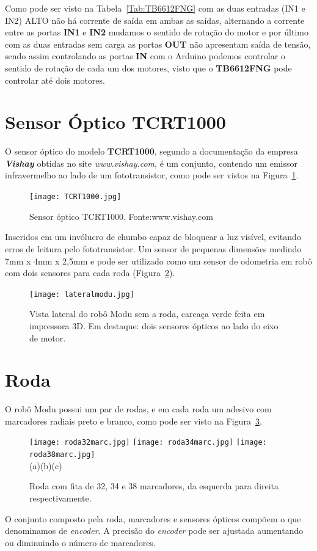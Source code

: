 \documentclass[a4paper,12pt,portuguese]{ufms-cpcx}
\begin{document}
Como pode ser visto na Tabela~\ref{Tab:TB6612FNG} com as duas entradas (IN1 e IN2) ALTO não há corrente de saída em ambas as saídas, alternando a corrente entre as portas \textbf{IN1} e \textbf{IN2} mudamos o sentido de rotação do motor e por último com as duas entradas sem carga as portas \textbf{OUT} não apresentam saída de tensão, sendo assim controlando as portas \textbf{IN} com o Arduino podemos controlar o sentido de rotação de cada um dos motores, visto que o \textbf{TB6612FNG} pode controlar até dois motores.

\section{Sensor Óptico TCRT1000}\label{TCRT1000}
O sensor óptico do modelo \textbf{TCRT1000}, segundo a documentação da empresa \textit{\textbf{Vishay}} obtidas no site \textit{www.vishay.com}, é um conjunto, contendo um emissor infravermelho ao lado de um fototransistor, como pode ser vistos na Figura~\ref{fig:TCRT1000}. 
\begin{figure}[H]
	\centering
	\texttt{[image: TCRT1000.jpg]}
	\caption{Sensor óptico TCRT1000. Fonte:www.vishay.com}
	\label{fig:TCRT1000}
\end{figure}
Inseridos em um invólucro de chumbo capaz de bloquear a luz visível, evitando erros de leitura pelo fototransistor. Um sensor de pequenas dimensões medindo 7mm x 4mm x 2,5mm e pode ser utilizado como um sensor de odometria em robô com dois sensores para cada roda (Figura~\ref{fig:lateralmodu}).
\begin{figure}[H]
	\centering
	\texttt{[image: lateralmodu.jpg]}
	\caption{Vista lateral do robô Modu sem a roda, carcaça verde feita em impressora 3D. Em destaque: dois sensores ópticos ao lado do eixo de motor.}
	\label{fig:lateralmodu}
\end{figure}

\section{Roda}\label{roda}
O robô Modu possui um par de rodas, e em cada roda um adesivo com marcadores radiais preto e branco, como pode ser visto na Figura~\ref{fig:rodasmarc}.
\begin{figure}[H]
	\centering
	\texttt{[image: roda32marc.jpg]}
	\texttt{[image: roda34marc.jpg]}
	\texttt{[image: roda38marc.jpg]}\\
	(a)\hspace{0.32\textwidth}(b)\hspace{0.32\textwidth}(c)
	\caption{Roda com fita de 32, 34 e 38 marcadores, da esquerda para direita respectivamente.}
	\label{fig:rodasmarc}
\end{figure}
O conjunto composto pela roda, marcadores e sensores ópticos compõem o que denominamos de {\em encoder}. A precisão do \textit{encoder} pode ser ajustada aumentando ou diminuindo o número de marcadores.
\end{document}
